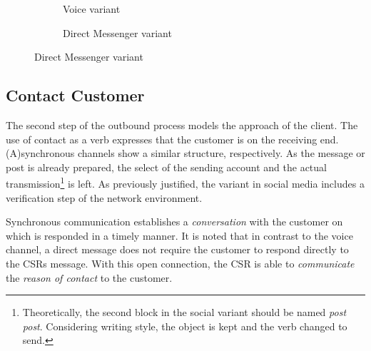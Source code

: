 \begin{figure}[caption={Prepare contact detail process}, label={fig:outbound:prep}]
\begin{subfigure}[b]{.45\textwidth}
\begin{tikzpicture}
				\end{tikzpicture}
				\caption{Voice variant}\label{fig:outbound:prep:voice}
			\end{subfigure}
			\begin{subfigure}[b]{.45\textwidth}
				\centering	
				\caption{Direct Messenger variant}\label{fig:outbound:prep:dm}
			\end{subfigure}
		\end{figure}
	
	
		\subsection{Contact Customer}
		
		The second step of the outbound process models the approach of the client. The use of contact as a verb expresses that the customer is on the receiving end. (A)synchronous channels show a similar structure, respectively. As the message or post is already prepared, the select of the sending account and the actual transmission\footnote{Theoretically, the second block in the social variant should be named \textit{post post}. Considering writing style, the object is kept and the verb changed to send. } is left. As previously justified, the variant in social media includes a verification step of the network environment. 
		
		Synchronous communication establishes a \textit{conversation} with the customer on which is responded in a timely manner. It is noted that in contrast to the voice channel, a direct message does not require the customer to respond directly to the \acrshort{CSR}s message. With this open connection, the  \acrshort{CSR} is able to \textit{communicate} the \textit{reason of contact} to the customer. 
		
